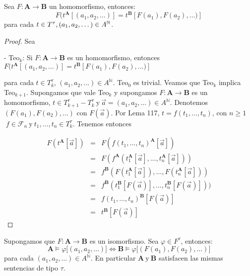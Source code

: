   \begin{lemma} \label{lemma_48}
    \PN Sea $F: \mathbf{A} \rightarrow \mathbf{B}$ un homomorfismo, entonces:
    \[
      F(t^{\mathbf{A}}[(a_{1}, a_{2}, \dotsc)] = t^{\mathbf{B}}[F(a_{1}), F(a_{2}), \dotsc)]
    \]
    \PN para cada $t \in T^{\tau}, (a_{1}, a_{2}, \dotsc) \in A^{\mathbb{N}}$.
  \end{lemma}
  \begin{proof}
    Sea

    - Teo$_{k}$: Si $F:\mathbf{A} \rightarrow \mathbf{B}$ es un homomorfismo, entonces
    $\displaystyle F(t^{\mathbf{A}}[(a_{1},a_{2},...)]=t^{\mathbf{B}}[F(a_{1}),F(a_{2}),...)] $

    para cada $t\in T_{k}^{\tau }$, $(a_{1},a_{2},...)\in A^{\mathbb{N}}$.
    Teo$_{0}$ es trivial. Veamos que Teo$_{k}$ implica Teo$_{k+1}$. Supongamos que vale Teo$_{k}$ y supongamos $F:\mathbf{A} \rightarrow \mathbf{B}$ es un homomorfismo, $t\in T_{k+1}^{\tau }-T_{k}^{\tau } \ \text{y} \ \vec{a} = (a_{1},a_{2},...)\in A^{\mathbb{N}}$. Denotemos $(F(a_{1}),F(a_{2}),...)$ con $F(\vec{a})$. Por Lema 117, $t=f(t_{1}, \dotsc, t_{n})$, con $n\geq 1 $$\;f\in \mathcal{F}_{n} \ \text{y} \ t_{1}, \dotsc, t_{n}\in T_{k}^{\tau }$. Tenemos entonces

    \[
      \begin{array}{ccl}
        F(t^{\mathbf{A}}[\vec{a}]) &=& F(f(t_{1}, \dotsc, t_{n})^{\mathbf{A}}[\vec{a}]) \\
        &=& F(f^{\mathbf{A}}(t_{1}^{\mathbf{A}}[\vec{a}], \dotsc, t_{n}^{\mathbf{A}}[ \vec{a}])) \\
        &=& f^{\mathbf{B}}(F(t_{1}^{\mathbf{A}}[\vec{a}]), \dotsc, F(t_{n}^{\mathbf{A}}[ \vec{a}])) \\
        &=& f^{\mathbf{B}}(t_{1}^{\mathbf{B}}[F(\vec{a})], \dotsc, t_{n}^{\mathbf{B}}[F( \vec{a})])) \\
        &=& f(t_{1}, \dotsc, t_{n})^{\mathbf{B}}[F(\vec{a})] \\
        &=& t^{\mathbf{B}}[F(\vec{a})]
      \end{array}
    \]
  \end{proof}

  \begin{lemma} \label{lemma_49}
    \PN Supongamos que $F: \mathbf{A} \rightarrow \mathbf{B}$ es un isomorfismo. Sea $\varphi \in F^{\tau}$, entonces:
    \[
      \mathbf{A} \models \varphi \lbrack (a_{1}, a_{2}, \dotsc)] \Leftrightarrow \mathbf{B} \models \varphi \lbrack
      (F(a_{1}), F(a_{2}), \dotsc)]
    \]
    \PN para cada $(a_{1}, a_{2}, \dotsc) \in A^{\mathbb{N}}$. En particular $\mathbf{A} \ \text{y} \ \mathbf{B}$ satisfacen las
    mismas sentencias de tipo $\tau$.
  \end{lemma}

